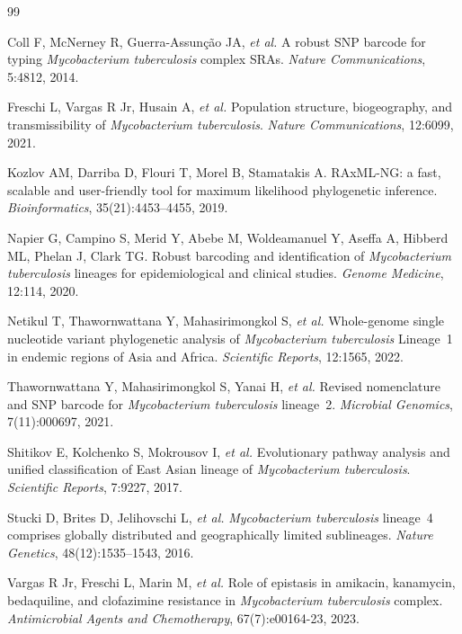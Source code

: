 \documentclass[11pt,a4paper]{article}
\begin{document}
\begin{thebibliography}{99}

	Coll F, McNerney R, Guerra-Assunção JA, \textit{et al.}
	A robust SNP barcode for typing \textit{Mycobacterium tuberculosis} complex SRAs.
	\textit{Nature Communications}, 5:4812, 2014.

	Freschi L, Vargas R Jr, Husain A, \textit{et al.}
	Population structure, biogeography, and transmissibility of \textit{Mycobacterium tuberculosis}.
	\textit{Nature Communications}, 12:6099, 2021.

	Kozlov AM, Darriba D, Flouri T, Morel B, Stamatakis A.
	RAxML-NG: a fast, scalable and user-friendly tool for maximum likelihood phylogenetic inference.
	\textit{Bioinformatics}, 35(21):4453--4455, 2019.

	Napier G, Campino S, Merid Y, Abebe M, Woldeamanuel Y, Aseffa A,
	Hibberd ML, Phelan J, Clark TG.
	Robust barcoding and identification of \textit{Mycobacterium tuberculosis}
	lineages for epidemiological and clinical studies.
	\textit{Genome Medicine}, 12:114, 2020.

	Netikul T, Thawornwattana Y, Mahasirimongkol S, \textit{et al.}
	Whole-genome single nucleotide variant phylogenetic analysis of
	\textit{Mycobacterium tuberculosis} Lineage~1 in endemic regions of Asia and Africa.
	\textit{Scientific Reports}, 12:1565, 2022.

	Thawornwattana Y, Mahasirimongkol S, Yanai H, \textit{et al.}
	Revised nomenclature and SNP barcode for \textit{Mycobacterium tuberculosis} lineage~2.
	\textit{Microbial Genomics}, 7(11):000697, 2021.

	Shitikov E, Kolchenko S, Mokrousov I, \textit{et al.}
	Evolutionary pathway analysis and unified classification of East Asian lineage of
	\textit{Mycobacterium tuberculosis}.
	\textit{Scientific Reports}, 7:9227, 2017.

	Stucki D, Brites D, Jelihovschi L, \textit{et al.}
	\textit{Mycobacterium tuberculosis} lineage~4 comprises globally distributed and
	geographically limited sublineages.
	\textit{Nature Genetics}, 48(12):1535--1543, 2016.

	Vargas R Jr, Freschi L, Marin M, \textit{et al.}
	Role of epistasis in amikacin, kanamycin, bedaquiline, and clofazimine
	resistance in \textit{Mycobacterium tuberculosis} complex.
	\textit{Antimicrobial Agents and Chemotherapy}, 67(7):e00164-23, 2023.


\end{thebibliography}
\end{document}
